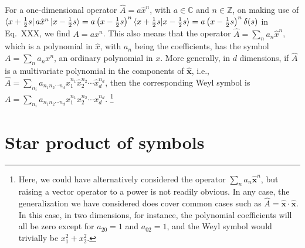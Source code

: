 \begin{example}
  For a one-dimensional operator $\hat{A} = a\hat{x}^{n}$, with $a \in \mathbb{C}$ and $n \in \mathbb{Z}$, on making use of $\mathinner{\langle{x + \frac{1}{2}s}\rvert}a\hat{x}^{n}\mathinner{\lvert{x - \frac{1}{2}s}\rangle} = a \left(x - \frac{1}{2}s\right)^{n}\mathinner{\langle{x + \frac{1}{2}s | x - \frac{1}{2}s}\rangle} = a\left(x - \frac{1}{2}s\right)^{n} \delta(s)$ in Eq.~XXX, we find $A = a x^{n}$.
  This also means that the operator $\hat{A} = \sum_{n} a_{n}\hat{x}^{n}$, which is a polynomial in $\hat{x}$, with $a_{n}$ being the coefficients, has the symbol
  $A = \sum_{n} a_{n}{x}^{n}$, an ordinary polynomial in $x$.
  More generally, in $d$ dimensions, if $\hat{A}$ is a multivariate polynomial in the components of $\hat{\bm{x}}$, i.e., $\hat{A} = \sum_{n_{i}} a_{n_{1}n_{2}\cdots n_{d}} \hat{x}_{1}^{n_{1}}\hat{x}_{2}^{n_{2}}\cdots \hat{x}_{d}^{n_{d}}$, then the corresponding Weyl symbol is $A = \sum_{n_{i}} a_{n_{1}n_{2}\cdots n_{d}} {x}_{1}^{n_{1}}{x}_{2}^{n_{2}}\cdots {x}_{d}^{n_{d}}$.%
  \footnote{Here, we could have alternatively considered the operator $\sum_{n} a_{n} \hat{\bm{x}}^{n}$, but raising a vector operator to a power is not readily obvious.
    In any case, the generalization we have considered does cover common cases such as $\hat{A} = \hat{\bm{x}}\cdot\hat{\bm{x}}$.
  In this case, in two dimensions, for instance, the polynomial coefficients will all be zero except for $a_{20} = 1$ and $a_{02} = 1$, and the Weyl symbol would trivially be $x_{1}^{2} + x_{2}^{2}$.}
\end{example}

\section{Star product of symbols}

